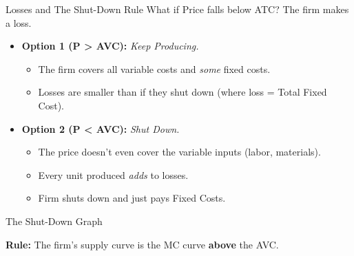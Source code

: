\documentclass[aspectratio=169, 10pt]{beamer}
\begin{document}
\begin{frame}{Losses and The Shut-Down Rule}
    What if Price falls below ATC? The firm makes a loss.
    
    \begin{itemize}
        \item \textbf{Option 1 (P > AVC):} \textit{Keep Producing.} 
        \begin{itemize}
            \item The firm covers all variable costs and \textit{some} fixed costs.
            \item Losses are smaller than if they shut down (where loss = Total Fixed Cost).
        \end{itemize}
        
        \item \textbf{Option 2 (P < AVC):} \textit{Shut Down.}
        \begin{itemize}
            \item The price doesn't even cover the variable inputs (labor, materials).
            \item Every unit produced \textit{adds} to losses.
            \item Firm shuts down and just pays Fixed Costs.
        \end{itemize}
    \end{itemize}
\end{frame}

\begin{frame}{The Shut-Down Graph}
    \begin{center}
    \end{center}
    \textbf{Rule:} The firm's supply curve is the MC curve \textbf{above} the AVC.
\end{frame}
\end{document}
